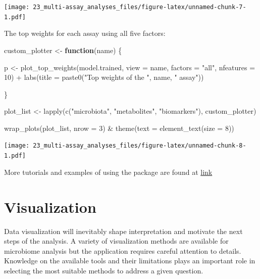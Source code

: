 \documentclass[
]{book}
\newenvironment{Shaded}{\begin{snugshade}}{\end{snugshade}}
\newcommand{\AttributeTok}[1]{\textcolor[rgb]{0.77,0.63,0.00}{#1}}
\newcommand{\ControlFlowTok}[1]{\textcolor[rgb]{0.13,0.29,0.53}{\textbf{#1}}}
\newcommand{\DecValTok}[1]{\textcolor[rgb]{0.00,0.00,0.81}{#1}}
\newcommand{\FunctionTok}[1]{\textcolor[rgb]{0.00,0.00,0.00}{#1}}
\newcommand{\NormalTok}[1]{#1}
\newcommand{\OtherTok}[1]{\textcolor[rgb]{0.56,0.35,0.01}{#1}}
\newcommand{\SpecialCharTok}[1]{\textcolor[rgb]{0.00,0.00,0.00}{#1}}
\newcommand{\StringTok}[1]{\textcolor[rgb]{0.31,0.60,0.02}{#1}}
\begin{document}
\texttt{[image: 23\_multi-assay\_analyses\_files/figure-latex/unnamed-chunk-7-1.pdf]}

The top weights for each assay using all five factors:

\begin{Shaded}
\begin{Highlighting}[]
\NormalTok{custom\_plotter }\OtherTok{\textless{}{-}} \ControlFlowTok{function}\NormalTok{(name) \{}
  
\NormalTok{  p }\OtherTok{\textless{}{-}} \FunctionTok{plot\_top\_weights}\NormalTok{(model.trained,}
                        \AttributeTok{view =}\NormalTok{ name,}
                        \AttributeTok{factors =} \StringTok{"all"}\NormalTok{,}
                        \AttributeTok{nfeatures =} \DecValTok{10}\NormalTok{) }\SpecialCharTok{+}
    \FunctionTok{labs}\NormalTok{(}\AttributeTok{title =} \FunctionTok{paste0}\NormalTok{(}\StringTok{"Top weights of the "}\NormalTok{, name, }\StringTok{" assay"}\NormalTok{))}
  
\NormalTok{\}}

\NormalTok{plot\_list }\OtherTok{\textless{}{-}} \FunctionTok{lapply}\NormalTok{(}\FunctionTok{c}\NormalTok{(}\StringTok{"microbiota"}\NormalTok{, }\StringTok{"metabolites"}\NormalTok{, }\StringTok{"biomarkers"}\NormalTok{), custom\_plotter)}

\FunctionTok{wrap\_plots}\NormalTok{(plot\_list, }\AttributeTok{nrow =} \DecValTok{3}\NormalTok{) }\SpecialCharTok{\&} \FunctionTok{theme}\NormalTok{(}\AttributeTok{text =} \FunctionTok{element\_text}\NormalTok{(}\AttributeTok{size =} \DecValTok{8}\NormalTok{))}
\end{Highlighting}
\end{Shaded}

\texttt{[image: 23\_multi-assay\_analyses\_files/figure-latex/unnamed-chunk-8-1.pdf]}

More tutorials and examples of using the package are found at \href{https://biofam.github.io/MOFA2/tutorials.html}{link}

\hypertarget{viz-chapter}{%
\chapter{Visualization}\label{viz-chapter}}

Data visualization will inevitably shape interpretation and motivate
the next steps of the analysis. A variety of visualization methods are
available for microbiome analysis but the application requires careful
attention to details. Knowledge on the available tools and their
limitations plays an important role in selecting the most suitable
methods to address a given question.
\end{document}
